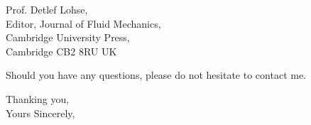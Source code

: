 \documentclass[10pt]{letter}
\begin{document}
\begin{letter}{
Prof. Detlef Lohse, \\
Editor, Journal of Fluid Mechanics, \\
Cambridge University Press, \\
Cambridge CB2 8RU UK
}
%


Should you have any questions, please do not hesitate to contact me.

\closing{Thanking you, \\Yours Sincerely,}

\end{letter}
\end{document}
